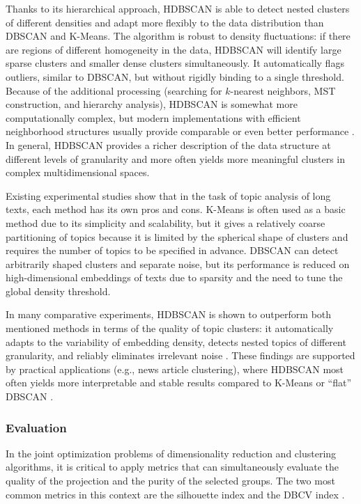 Thanks to its hierarchical approach, HDBSCAN is able to detect nested clusters of different densities
and adapt more flexibly to the data distribution than DBSCAN and K-Means. The algorithm is robust
to density fluctuations: if there are regions of different homogeneity in the data, HDBSCAN will identify
large sparse clusters and smaller dense clusters simultaneously. It automatically flags outliers, similar
to DBSCAN, but without rigidly binding to a single threshold. Because of the additional processing
(searching for $k$-nearest neighbors, MST construction, and hierarchy analysis), HDBSCAN is somewhat
more computationally complex, but modern implementations with efficient neighborhood structures usually
provide comparable or even better performance \parencite{HDBSCAN2017software}. In general, HDBSCAN
provides a richer description of the data structure at different levels of granularity and more often
yields more meaningful clusters in complex multidimensional spaces.

Existing experimental studies show that in the task of topic analysis of long texts, each method has its
own pros and cons. K-Means is often used as a basic method due to its simplicity and scalability, but
it gives a relatively coarse partitioning of topics because it is limited by the spherical shape
of clusters and requires the number of topics to be specified in advance. DBSCAN can detect arbitrarily
shaped clusters and separate noise, but its performance is reduced on high-dimensional embeddings of texts
due to sparsity and the need to tune the global density threshold.

In many comparative experiments, HDBSCAN is shown to outperform both mentioned methods in terms
of the quality of topic clusters: it automatically adapts to the variability of embedding density, detects
nested topics of different granularity, and reliably eliminates irrelevant noise
\parencite{HDBSCAN2017software, HDBSCAN2013}. These findings are supported by practical applications
(e.g., news article clustering), where HDBSCAN most often yields more interpretable and stable results
compared to K-Means or “flat” DBSCAN \parencite{BERTopic2022}.

\subsubsection{Evaluation}
In the joint optimization problems of dimensionality reduction and clustering algorithms, it is critical
to apply metrics that can simultaneously evaluate the quality of the projection and the purity of the selected
groups. The two most common metrics in this context are the silhouette index \parencite{silouette1987}
and the DBCV index \parencite{dbcv2014density}.

